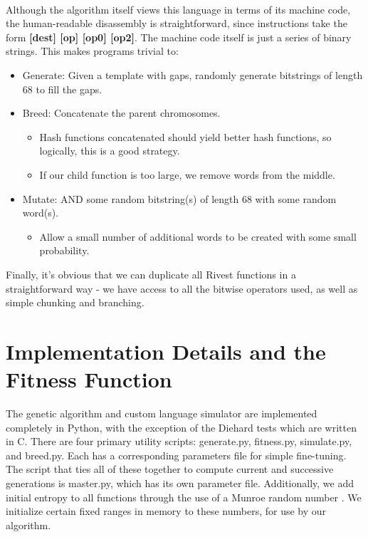\documentclass{article}
\begin{document}
\paragraph{}
Although the algorithm itself views this language in terms of its machine code, the human-readable disassembly is straightforward, since instructions take the form \textbf{[dest] [op] [op0] [op2]}. The machine code itself is just a series of binary strings. This makes programs trivial to:
	\begin{itemize}
	\item Generate: Given a template with gaps, randomly generate bitstrings of length 68 to fill the gaps.
	\item Breed: Concatenate the parent chromosomes.
		\begin{itemize}
			\item Hash functions concatenated should yield better hash functions, so logically, this is a good strategy.
			\item If our child function is too large, we remove words from the middle.
		\end{itemize}
	\item Mutate: AND some random bitstring(s) of length 68 with some random word(s).
		\begin{itemize}
		\item Allow a small number of additional words to be created with some small probability.
		\end{itemize}
	\end{itemize}

Finally, it's obvious that we can duplicate all Rivest functions in a straightforward way - we have access to all the bitwise operators used, as well as simple chunking and branching.

\section{Implementation Details and the Fitness Function}
The genetic algorithm and custom language simulator are implemented completely in Python, with the exception of the Diehard tests \cite{Diehard} which are written in C. There are four primary utility scripts: generate.py, fitness.py, simulate.py, and breed.py. Each has a corresponding parameters file for simple fine-tuning. The script that ties all of these together to compute current and successive generations is master.py, which has its own parameter file. Additionally, we add initial entropy to all functions through the use of a Munroe random number \cite{Munroe}. We initialize certain fixed ranges in memory to these numbers, for use by our algorithm.
\end{document}
